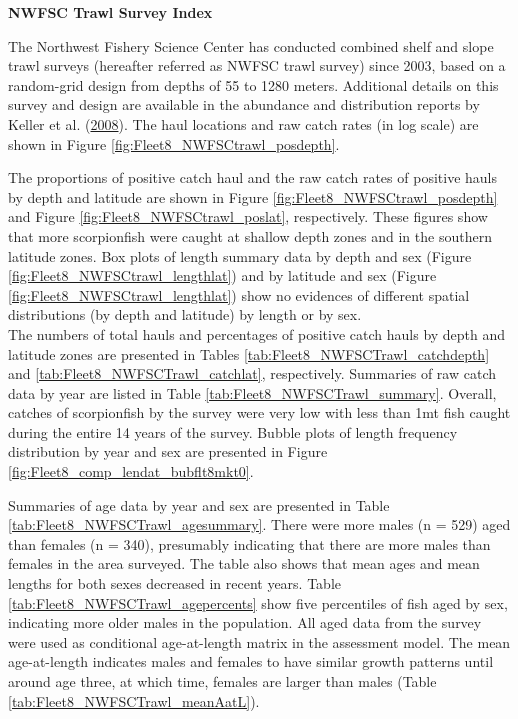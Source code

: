 \documentclass[12pt,]{article}
\begin{document}
\textbf{NWFSC Trawl Survey Index}

The Northwest Fishery Science Center has conducted combined shelf and
slope trawl surveys (hereafter referred as NWFSC trawl survey) since
2003, based on a random-grid design from depths of 55 to 1280 meters.
Additional details on this survey and design are available in the
abundance and distribution reports by Keller et al.
(\protect\hyperlink{ref-Keller2008}{2008}). The haul locations and raw
catch rates (in log scale) are shown in Figure
\ref{fig:Fleet8_NWFSCtrawl_posdepth}.

The proportions of positive catch haul and the raw catch rates of
positive hauls by depth and latitude are shown in Figure
\ref{fig:Fleet8_NWFSCtrawl_posdepth} and Figure
\ref{fig:Fleet8_NWFSCtrawl_poslat}, respectively. These figures show
that more scorpionfish were caught at shallow depth zones and in the
southern latitude zones. Box plots of length summary data by depth and
sex (Figure \ref{fig:Fleet8_NWFSCtrawl_lengthlat}) and by latitude and
sex (Figure \ref{fig:Fleet8_NWFSCtrawl_lengthlat}) show no evidences of
different spatial distributions (by depth and latitude) by length or by
sex.\\
The numbers of total hauls and percentages of positive catch hauls by
depth and latitude zones are presented in Tables
\ref{tab:Fleet8_NWFSCTrawl_catchdepth} and
\ref{tab:Fleet8_NWFSCTrawl_catchlat}, respectively. Summaries of raw
catch data by year are listed in Table
\ref{tab:Fleet8_NWFSCTrawl_summary}. Overall, catches of scorpionfish by
the survey were very low with less than 1mt fish caught during the
entire 14 years of the survey. Bubble plots of length frequency
distribution by year and sex are presented in Figure
\ref{fig:Fleet8_comp_lendat_bubflt8mkt0}.

Summaries of age data by year and sex are presented in Table
\ref{tab:Fleet8_NWFSCTrawl_agesummary}. There were more males (n = 529)
aged than females (n = 340), presumably indicating that there are more
males than females in the area surveyed. The table also shows that mean
ages and mean lengths for both sexes decreased in recent years. Table
\ref{tab:Fleet8_NWFSCTrawl_agepercents} show five percentiles of fish
aged by sex, indicating more older males in the population. All aged
data from the survey were used as conditional age-at-length matrix in
the assessment model. The mean age-at-length indicates males and females
to have similar growth patterns until around age three, at which time,
females are larger than males (Table
\ref{tab:Fleet8_NWFSCTrawl_meanAatL}).
\end{document}
